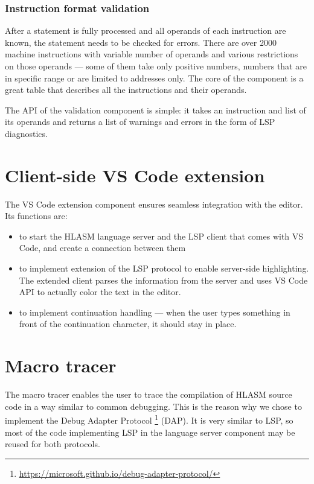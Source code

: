 \subsubsection{Instruction format validation}
After a statement is fully processed and all operands of each instruction are known, the statement needs to be checked for errors. There are over 2000 machine instructions with variable number of operands and various restrictions on those operands --- some of them take only positive numbers, numbers that are in specific range or are limited to addresses only. The core of the component is a great table that describes all the instructions and their operands.

The API of the validation component is simple: it takes an instruction and list of its operands and returns a list of warnings and errors in the form of LSP diagnostics.

\section{Client-side VS Code extension}

The VS Code extension component ensures seamless integration with the editor. Its functions are:

\begin{itemize}
	\item to start the HLASM language server and the LSP client that comes with VS Code, and create a connection between them
	\item to implement extension of the LSP protocol to enable server-side highlighting. The extended client parses the information from the server and uses VS Code API to actually color the text in the editor.
	\item to implement continuation handling --- when the user types something in front of the continuation character, it should stay in place.
\end{itemize}


\section{Macro tracer}
The macro tracer enables the user to trace the compilation of HLASM source code in a way similar to common debugging. This is the reason why we chose to implement the Debug Adapter Protocol \footnote{\url{https://microsoft.github.io/debug-adapter-protocol/}} (DAP). It is very similar to LSP, so most of the code implementing LSP in the language server component may be reused for both protocols.

